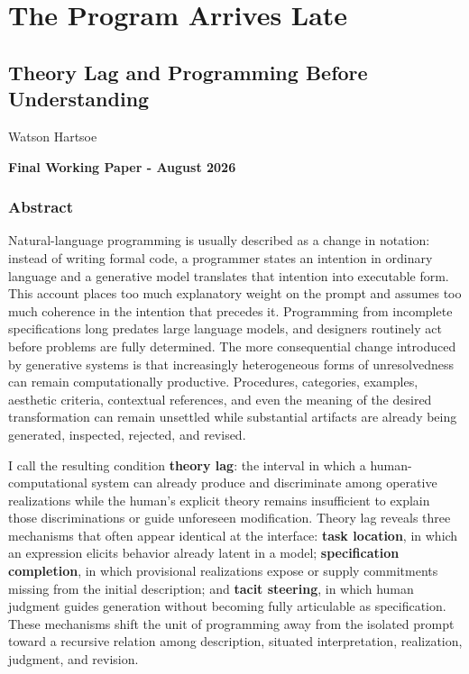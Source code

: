 \documentclass[
]{article}
\author{}
\date{}
\begin{document}
\section{The Program Arrives Late}\label{the-program-arrives-late}

\subsection{Theory Lag and Programming Before
Understanding}\label{theory-lag-and-programming-before-understanding}

Watson Hartsoe

\textbf{Final Working Paper - August 2026}

\subsubsection{Abstract}\label{abstract}

Natural-language programming is usually described as a change in
notation: instead of writing formal code, a programmer states an
intention in ordinary language and a generative model translates that
intention into executable form. This account places too much explanatory
weight on the prompt and assumes too much coherence in the intention
that precedes it. Programming from incomplete specifications long
predates large language models, and designers routinely act before
problems are fully determined. The more consequential change introduced
by generative systems is that increasingly heterogeneous forms of
unresolvedness can remain computationally productive. Procedures,
categories, examples, aesthetic criteria, contextual references, and
even the meaning of the desired transformation can remain unsettled
while substantial artifacts are already being generated, inspected,
rejected, and revised.

I call the resulting condition \textbf{theory lag}: the interval in
which a human-computational system can already produce and discriminate
among operative realizations while the human's explicit theory remains
insufficient to explain those discriminations or guide unforeseen
modification. Theory lag reveals three mechanisms that often appear
identical at the interface: \textbf{task location}, in which an
expression elicits behavior already latent in a model;
\textbf{specification completion}, in which provisional realizations
expose or supply commitments missing from the initial description; and
\textbf{tacit steering}, in which human judgment guides generation
without becoming fully articulable as specification. These mechanisms
shift the unit of programming away from the isolated prompt toward a
recursive relation among description, situated interpretation,
realization, judgment, and revision.
\end{document}
